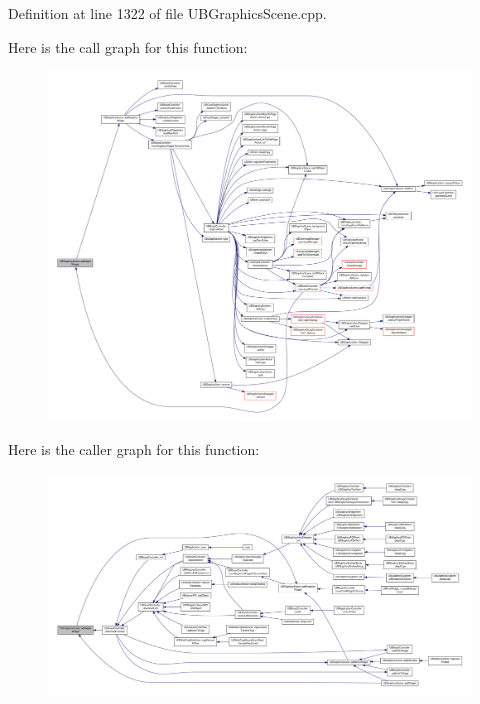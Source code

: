 Definition at line 1322 of file U\-B\-Graphics\-Scene.\-cpp.



Here is the call graph for this function\-:
\nopagebreak
\begin{figure}[H]
\begin{center}
\leavevmode
\includegraphics[width=350pt]{dc/db2/class_u_b_graphics_scene_aa86ec061e79ba18c2efe73a6bf10bf33_cgraph}
\end{center}
\end{figure}




Here is the caller graph for this function\-:
\nopagebreak
\begin{figure}[H]
\begin{center}
\leavevmode
\includegraphics[width=350pt]{dc/db2/class_u_b_graphics_scene_aa86ec061e79ba18c2efe73a6bf10bf33_icgraph}
\end{center}
\end{figure}


